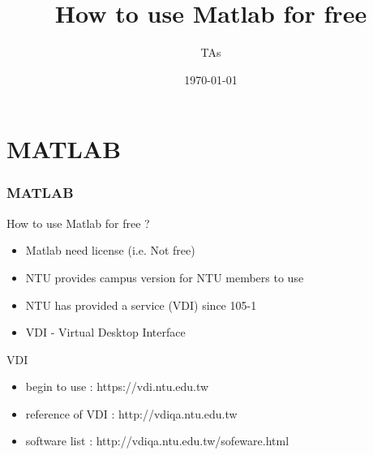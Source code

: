 \documentclass [12pt] {beamer}
\begin{document}
    \title [How to use Matlab for free \hspace {3em} \insertframenumber / \inserttotalframenumber ] {How to use Matlab for free}
    \date {\today}
    \author {TAs}
    \begin {frame}
        \titlepage
    \end {frame}

    \section {MATLAB}
    \begin {frame}
        \frametitle {MATLAB}
        \begin {block} {How to use Matlab for free ?}
        \begin {itemize}
            \item Matlab need license (i.e. Not free)
            \item NTU provides campus version for NTU members to use
            \item NTU has provided a service (VDI) since 105-1
            \vspace {24pt}
            \item VDI - Virtual Desktop Interface
        \end {itemize}
        \end {block}
        \begin {block} {VDI}
        \begin {itemize}
            \item begin to use : https://vdi.ntu.edu.tw
            \item reference of VDI : http://vdiqa.ntu.edu.tw
            \item software list : http://vdiqa.ntu.edu.tw/sofeware.html
        \end {itemize}
        \end {block}
    \end {frame}
\end{document}
